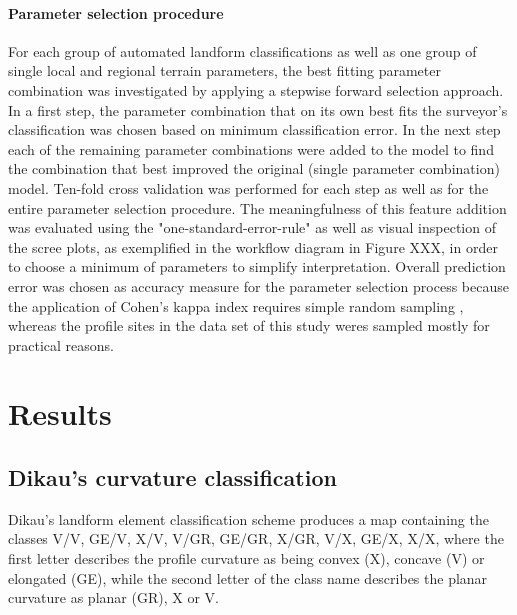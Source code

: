 \documentclass[preprint,12pt,authoryear]{elsarticle}
\begin{document}
\paragraph{Parameter selection procedure} For each group of automated landform classifications as well as one group of single local and regional terrain parameters, the best fitting parameter combination was investigated by applying a stepwise forward selection approach. In a first step, the parameter combination that on its own best fits the surveyor's classification was chosen based on minimum classification error. In the next step each of the remaining parameter combinations were added to the model to find the combination that best improved the original (single parameter combination) model. Ten-fold cross validation was performed for each step as well as for the entire parameter selection procedure. The meaningfulness of this feature addition was evaluated using the "one-standard-error-rule" \citep{James2013} as well as visual inspection of the scree plots, as exemplified in the workflow diagram in Figure XXX, in order to choose a minimum of parameters to simplify interpretation. Overall prediction error was chosen as accuracy measure for the parameter selection process because the application of Cohen's kappa index requires simple random sampling \citep{Congalton1991}, whereas the profile sites in the data set of this study weres sampled mostly for practical reasons.
\section{Results}
\subsection{Dikau's curvature classification}
Dikau's landform element classification scheme produces a map containing the classes V/V, GE/V, X/V, V/GR, GE/GR, X/GR, V/X, GE/X, X/X, where the first letter describes the profile curvature as being convex (X), concave (V) or elongated (GE), while the second letter of the class name describes the planar curvature as planar (GR), X or V.
\end{document}
